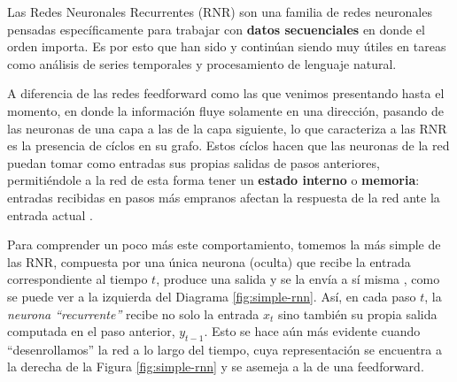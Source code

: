 \documentclass[../../main.tex]{subfiles}
\begin{document}
Las Redes Neuronales Recurrentes (RNR) son una familia de redes neuronales pensadas
específicamente para trabajar con \textbf{datos secuenciales} en donde el orden importa.
Es por esto que han sido y continúan siendo muy útiles en tareas como análisis de series
temporales y procesamiento de lenguaje natural.

A diferencia de las redes feedforward como las que venimos presentando hasta el momento,
en donde la información fluye solamente en una dirección, pasando de las neuronas de una
capa a las de la capa siguiente, lo que caracteriza a las RNR es la presencia de cíclos en
su grafo. Estos cíclos hacen que las neuronas de la red puedan tomar como entradas
sus propias salidas de pasos anteriores, permitiéndole a la red de esta forma tener
un \textbf{estado interno} o \textbf{memoria}: entradas recibidas en pasos más empranos
afectan la respuesta de la red ante la entrada actual \cite{ai-a-modern-approach}.

Para comprender un poco más este comportamiento, tomemos la más simple de las RNR,
compuesta por una única neurona (oculta) que recibe la entrada correspondiente al tiempo
\(t\), produce una salida y se la envía a sí misma \cite{hands-on-ML-sklearn-tf}, como se
puede ver a la izquierda del Diagrama \ref{fig:simple-rnn}. Así, en cada paso \(t\), la
\textit{neurona ``recurrente''} recibe no solo la entrada \(x_t\) sino también su propia
salida computada en el paso anterior, \(y_{t-1}\). Esto se hace aún más evidente cuando
``desenrollamos'' la red a lo largo del tiempo, cuya representación se encuentra a la
derecha de la Figura \ref{fig:simple-rnn} y se asemeja a la de una feedforward.
\end{document}
